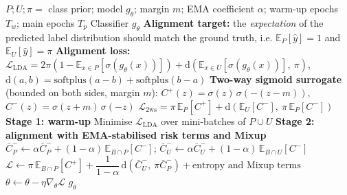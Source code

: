 \documentclass{article}
\begin{document}
\begin{algorithm}[!h]
\renewcommand{\algorithmicrequire}{\textbf{Input:}} %
\renewcommand{\algorithmicensure}{\textbf{Output:}} %
	\caption{PULDA (PU learning with label distribution alignment)} %
	\begin{algorithmic}[1] %
	    \REQUIRE
	    $P;U;\pi=$ class prior; model $g_{\theta}$; margin $m$; EMA coefficient $\alpha$;
	    warm-up epochs $T_{w}$; main epochs $T_{p}$
	    \ENSURE
	    Classifier $g_{\theta}$
	    \STATE \textbf{Alignment target:} the \emph{expectation} of the predicted label distribution
	    should match the ground truth, i.e. $\mathbb{E}_{P}[\hat{y}]=1$ and $\mathbb{E}_{U}[\hat{y}]=\pi$ %
	    \STATE \textbf{Alignment loss:}
	    $\mathcal{L}_{\mathrm{LDA}}=2\pi\left(1-\mathbb{E}_{x\in P}[\sigma(g_{\theta}(x))]\right)
	    +\mathrm{d}\!\left(\mathbb{E}_{x\in U}[\sigma(g_{\theta}(x))],\ \pi\right)$, \quad
	    $\mathrm{d}(a,b)=\mathrm{softplus}(a-b)+\mathrm{softplus}(b-a)$ %
	    \STATE \textbf{Two-way sigmoid surrogate} (bounded on both sides, margin $m$):
	    \STATE \quad $C^{+}(z)=\sigma(z)\,\sigma(-(z-m))$, \qquad $C^{-}(z)=\sigma(z+m)\,\sigma(-z)$
	    \STATE \quad $\mathcal{L}_{\mathrm{2ws}}=\pi\,\mathbb{E}_{P}[C^{+}]
	    +\mathrm{d}\!\left(\mathbb{E}_{U}[C^{-}],\ \pi\,\mathbb{E}_{P}[C^{-}]\right)$ %
	    \STATE \textbf{Stage 1: warm-up}
	    \STATE Minimise $\mathcal{L}_{\mathrm{LDA}}$ over mini-batches of $P\cup U$
	    \ENDFOR
	    \STATE \textbf{Stage 2: alignment with EMA-stabilised risk terms and Mixup}
	    \STATE $\bar{C}_{P}^{-}\leftarrow \alpha\bar{C}_{P}^{-}+(1-\alpha)\,\mathbb{E}_{B\cap P}[C^{-}]$;\quad
	    $\bar{C}_{U}^{-}\leftarrow \alpha\bar{C}_{U}^{-}+(1-\alpha)\,\mathbb{E}_{B\cap U}[C^{-}]$ %
	    \STATE $\mathcal{L}\leftarrow \pi\,\mathbb{E}_{B\cap P}[C^{+}]
	    +\dfrac{1}{1-\alpha}\,\mathrm{d}\!\left(\bar{C}_{U}^{-},\ \pi\bar{C}_{P}^{-}\right)
	    +\text{entropy and Mixup terms}$
	    \STATE $\theta\leftarrow \theta-\eta\nabla_{\theta}\mathcal{L}$
	    \ENDFOR
	    \ENDFOR
		\RETURN $g_{\theta}$
	\end{algorithmic}
\end{algorithm}
\end{document}
